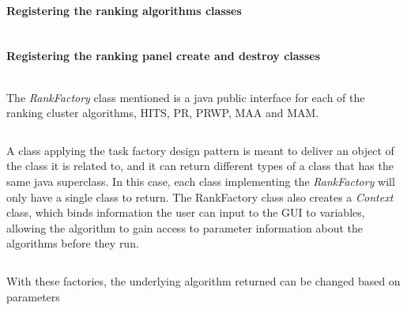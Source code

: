 \paragraph{Registering the ranking algorithms classes}
\inputminted[linenos,fontsize=\scriptsize,firstline=65,lastline=93]{java}{../ranklust-app/src/main/java/edu/ucsf/rbvi/clusterMaker2/internal/CyActivator.java}

\paragraph{Registering the ranking panel create and destroy classes}
\inputminted[linenos,fontsize=\scriptsize,firstline=173,lastline=180]{java}{../ranklust-app/src/main/java/edu/ucsf/rbvi/clusterMaker2/internal/CyActivator.java}

The \textit{RankFactory} class mentioned is a java public interface for each of
the ranking cluster algorithms, HITS, PR, PRWP, MAA and MAM. 

\inputminted[linenos,fontsize=\scriptsize,firstline=3,lastline=10]{java}{../ranklust-app/src/main/java/edu/ucsf/rbvi/clusterMaker2/internal/api/RankFactory.java}

A class applying the task factory design pattern is meant to deliver an object
of the class it is related to\cite{factory-design}, and it can return different
types of a class that has the same java superclass\cite{java-superclass}. In
this case, each class implementing the \textit{RankFactory} will only have a
single class to return. The RankFactory class also creates a \textit{Context}
class, which binds information the user can input to the GUI to variables,
allowing the algorithm to gain access to parameter information about the
algorithms before they run.

\inputminted[linenos,fontsize=\scriptsize,firstline=144,lastline=149]{java}{../ranklust-app/src/main/java/edu/ucsf/rbvi/clusterMaker2/internal/CyActivator.java}

With these factories, the underlying algorithm returned can be changed based on
parameters

\inputminted[linenos,fontsize=\scriptsize,firstline=186,lastline=207]{java}{../ranklust-app/src/main/java/edu/ucsf/rbvi/clusterMaker2/internal/ClusterManagerImpl.java}

\inputminted[linenos,fontsize=\scriptsize,firstline=260,lastline=282]{java}{../ranklust-app/src/main/java/edu/ucsf/rbvi/clusterMaker2/internal/ClusterManagerImpl.java}
